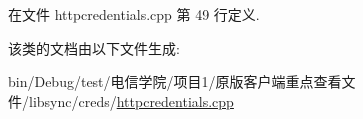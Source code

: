 在文件 httpcredentials.\+cpp 第 49 行定义.



该类的文档由以下文件生成\+:\begin{DoxyCompactItemize}
\item 
bin/\+Debug/test/电信学院/项目1/原版客户端重点查看文件/libsync/creds/\hyperlink{httpcredentials_8cpp}{httpcredentials.\+cpp}\end{DoxyCompactItemize}

